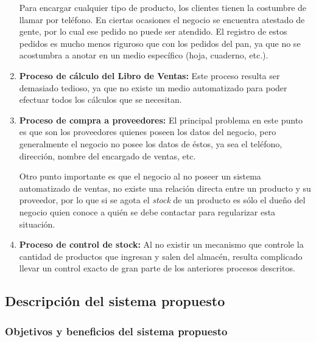 \documentclass[letterpaper,12pt]{article}
\begin{document}
\begin{enumerate}
Para encargar cualquier tipo de producto, los clientes tienen la costumbre de llamar por teléfono. En ciertas ocasiones 
el negocio se encuentra atestado de gente, por lo cual ese pedido no puede ser atendido. El registro de estos 
pedidos es mucho menos riguroso que con los pedidos del pan, ya que no se acostumbra a anotar en un medio específico 
(hoja, cuaderno, etc.).

\item \textbf{Proceso de cálculo del Libro de Ventas:}
Este proceso resulta ser demasiado tedioso, ya que no existe un medio automatizado para poder efectuar todos los 
cálculos que se necesitan.

\item \textbf{Proceso de compra a proveedores:}
El principal problema en este punto es que son los proveedores quienes poseen los datos del negocio, pero generalmente
el negocio no posee los datos de éstos, ya sea el teléfono, dirección, nombre del encargado de ventas, etc.

Otro punto importante es que el negocio al no poseer un sistema automatizado de ventas, no existe una relación directa entre 
un producto y su proveedor, por lo que si se agota el \emph{stock} de un producto es sólo el dueño del negocio quien 
conoce a quién se debe contactar para regularizar esta situación.

\newpage

\item \textbf{Proceso de control de stock:}
Al no existir un mecanismo que controle la cantidad de productos que ingresan y salen del almacén, resulta complicado llevar
un control exacto de gran parte de los anteriores procesos descritos.

\end{enumerate}

\newpage

\subsection{Descripción del sistema propuesto}

\subsubsection{Objetivos y beneficios del sistema propuesto}
\end{document}
